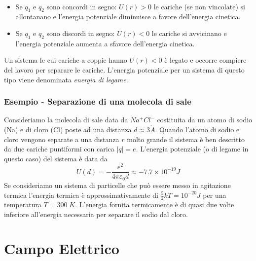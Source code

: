 \begin{remark}\
\begin{itemize}
\item 	Se $q_1$ e $q_2$ sono concordi in segno: $U(r) > 0$ le cariche (se non vincolate) si allontanano e l'energia potenziale diminuisce a favore dell'energia cinetica.
\item Se $q_1$ e $q_2$ sono discordi in segno: $U(r) < 0$ le cariche si avvicinano e l'energia potenziale aumenta a sfavore dell'energia cinetica.
\end{itemize}
\end{remark}
\noindent Un sistema le cui cariche a coppie hanno $U(r) < 0$ \`e legato  e occorre compiere del lavoro per separare le cariche. L'energia potenziale per un sistema di questo tipo viene denominata \textit{energia di legame}.

\subsubsection{Esempio - Separazione di una molecola di sale}

Consideriamo la molecola di sale data da $Na^+Cl^-$ costituita da un atomo di sodio (Na) e di cloro (Cl) poste ad una distanza $d \approx 3 \mathring{A}$. Quando l'atomo di sodio e cloro vengono separate a una distanza $r$ molto grande il sistema \`e ben descritto da due cariche puntiformi con carica $|q| = e$. L'energia potenziale (o di legame in questo caso) del sistema \`e data da 
\begin{equation*}
	U (d) = - \frac{e^2}{4 \pi \varepsilon_0 d} \approx - 7.7 \times 10^{-19}J 
\end{equation*}
Se consideriamo un sistema di particelle che pu\`o essere messo in agitazione termica l'energia termica \`e approssimativamente di $\frac{5}{2}kT  = 10^{-20} J$ per una temperatura $T = 300 \;K$. L'energia fornita termicamente \`e di quasi due volte inferiore all'energia necessaria per separare il sodio dal cloro.

\section{Campo Elettrico}


